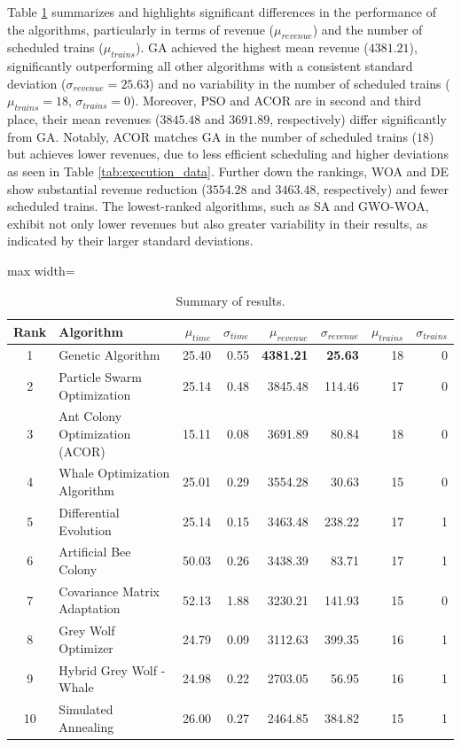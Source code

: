 \documentclass[Afour,sagev,times]{sagej}
\begin{document}
Table \ref{tab:summary_results_compact} summarizes and highlights significant differences in the performance of the algorithms, particularly in terms of revenue (\(\mu_{revenue}\)) and the number of scheduled trains (\(\mu_{trains}\)). \gls{GA} achieved the highest mean revenue (\(4381.21\)), significantly outperforming all other algorithms with a consistent standard deviation (\(\sigma_{revenue} = 25.63\)) and no variability in the number of scheduled trains (\(\mu_{trains} = 18\), \(\sigma_{trains} = 0\)). Moreover, \gls{PSO} and \gls{ACOR} are in second and third place, their mean revenues (\(3845.48\) and \(3691.89\), respectively) differ significantly from \gls{GA}. Notably, \gls{ACOR} matches \gls{GA} in the number of scheduled trains (\(18\)) but achieves lower revenues, due to less efficient scheduling and higher deviations as seen in Table \ref{tab:execution_data}. Further down the rankings, \gls{WOA} and \gls{DE} show substantial revenue reduction (\(3554.28\) and \(3463.48\), respectively) and fewer scheduled trains. The lowest-ranked algorithms, such as \gls{SA} and \gls{GWO-WOA}, exhibit not only lower revenues but also greater variability in their results, as indicated by their larger standard deviations.

\begin{table}[!ht]
\centering
\caption{Summary of results.}
\begin{adjustbox}{max width=\textwidth}
\begin{tabular}{|c|l|r|r|r|r|r|r|}
\hline
\textbf{Rank} & \textbf{Algorithm} & \(\mu_{time}\) & \(\sigma_{time}\) & \(\mu_{revenue}\) & \(\sigma_{revenue}\) & \(\mu_{trains}\) & \(\sigma_{trains}\) \\ \hline \hline
1 & Genetic Algorithm & 25.40 & 0.55 & \textbf{4381.21} & \textbf{25.63} & 18 & 0 \\ \hline
2 & Particle Swarm Optimization & 25.14 & 0.48 & 3845.48 & 114.46 & 17 & 0 \\ \hline
3 & Ant Colony Optimization (ACOR) & 15.11 & 0.08 & 3691.89 & 80.84 & 18 & 0 \\ \hline
4 & Whale Optimization Algorithm & 25.01 & 0.29 & 3554.28 & 30.63 & 15 & 0 \\ \hline
5 & Differential Evolution & 25.14 & 0.15 & 3463.48 & 238.22 & 17 & 1 \\ \hline
6 & Artificial Bee Colony & 50.03 & 0.26 & 3438.39 & 83.71 & 17 & 1 \\ \hline
7 & Covariance Matrix Adaptation & 52.13 & 1.88 & 3230.21 & 141.93 & 15 & 0 \\ \hline
8 & Grey Wolf Optimizer & 24.79 & 0.09 & 3112.63 & 399.35 & 16 & 1 \\ \hline
9 & Hybrid Grey Wolf - Whale & 24.98 & 0.22 & 2703.05 & 56.95 & 16 & 1 \\ \hline
10 & Simulated Annealing & 26.00 & 0.27 & 2464.85 & 384.82 & 15 & 1 \\ \hline
\end{tabular}
\end{adjustbox}
\label{tab:summary_results_compact}
\end{table}
\end{document}
